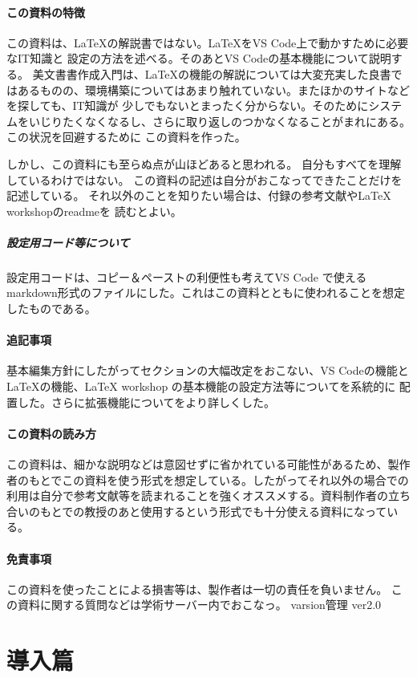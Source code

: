 \documentclass{ltjsarticle}
\begin{document}
\subsection{この資料の特徴}
この資料は、\LaTeX の解説書ではない。\LaTeX をVS Code上で動かすために必要なIT知識と
設定の方法を述べる。そのあとVS Codeの基本機能について説明する。
美文書書作成入門\cite{美文書本}は、\LaTeX の機能の解説については大変充実した良書ではあるものの、環境構築についてはあまり触れていない。またほかのサイトなどを探しても、IT知識が
少しでもないとまったく分からない。そのためにシステムをいじりたくなくなるし、さらに取り返しのつかなくなることがまれにある。この状況を回避するために
この資料を作った。

しかし、この資料にも至らぬ点が山ほどあると思われる。
自分もすべてを理解しているわけではない。
この資料の記述は自分がおこなってできたことだけを記述している。
それ以外のことを知りたい場合は、付録の参考文献やLaTeX workshopのreadmeを
読むとよい。
\subsubsection{設定用コード等について}
設定用コードは、コピー＆ペーストの利便性も考えてVS Code で使えるmarkdown形式のファイルにした。これはこの資料とともに使われることを想定したものである。
\subsection{追記事項}
基本編集方針にしたがってセクションの大幅改定をおこない、VS Codeの機能と
\LaTeX の機能、LaTeX workshop の基本機能の設定方法等についてを系統的に
配置した。さらに拡張機能についてをより詳しくした。
\subsection{この資料の読み方}
この資料は、細かな説明などは意図せずに省かれている可能性があるため、製作者のもとでこの資料を使う形式を想定している。したがってそれ以外の場合での利用は自分で参考文献等を読まれることを強くオススメする。資料制作者の立ち合いのもとでの教授のあと使用するという形式でも十分使える資料になっている。
\subsection{免責事項}
この資料を使ったことによる損害等は、製作者は一切の責任を負いません。
この資料に関する質問などは学術サーバー内でおこなっ。
varsion管理  ver2.0
\tableofcontents
\part{導入篇}
\end{document}
